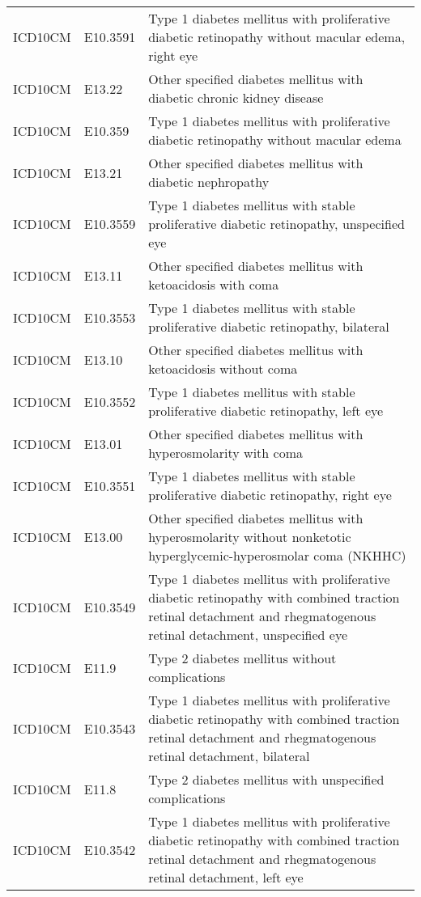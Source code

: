 \begin{table}[ht]
\begin{tabular}{lll}
  ICD10CM & E10.3591 & Type 1 diabetes mellitus with proliferative diabetic retinopathy without macular edema, right eye \\ 
  ICD10CM & E13.22 & Other specified diabetes mellitus with diabetic chronic kidney disease \\ 
  ICD10CM & E10.359 & Type 1 diabetes mellitus with proliferative diabetic retinopathy without macular edema \\ 
  ICD10CM & E13.21 & Other specified diabetes mellitus with diabetic nephropathy \\ 
  ICD10CM & E10.3559 & Type 1 diabetes mellitus with stable proliferative diabetic retinopathy, unspecified eye \\ 
  ICD10CM & E13.11 & Other specified diabetes mellitus with ketoacidosis with coma \\ 
  ICD10CM & E10.3553 & Type 1 diabetes mellitus with stable proliferative diabetic retinopathy, bilateral \\ 
  ICD10CM & E13.10 & Other specified diabetes mellitus with ketoacidosis without coma \\ 
  ICD10CM & E10.3552 & Type 1 diabetes mellitus with stable proliferative diabetic retinopathy, left eye \\ 
  ICD10CM & E13.01 & Other specified diabetes mellitus with hyperosmolarity with coma \\ 
  ICD10CM & E10.3551 & Type 1 diabetes mellitus with stable proliferative diabetic retinopathy, right eye \\ 
  ICD10CM & E13.00 & Other specified diabetes mellitus with hyperosmolarity without nonketotic hyperglycemic-hyperosmolar coma (NKHHC) \\ 
  ICD10CM & E10.3549 & Type 1 diabetes mellitus with proliferative diabetic retinopathy with combined traction retinal detachment and rhegmatogenous retinal detachment, unspecified eye \\ 
  ICD10CM & E11.9 & Type 2 diabetes mellitus without complications \\ 
  ICD10CM & E10.3543 & Type 1 diabetes mellitus with proliferative diabetic retinopathy with combined traction retinal detachment and rhegmatogenous retinal detachment, bilateral \\ 
  ICD10CM & E11.8 & Type 2 diabetes mellitus with unspecified complications \\ 
  ICD10CM & E10.3542 & Type 1 diabetes mellitus with proliferative diabetic retinopathy with combined traction retinal detachment and rhegmatogenous retinal detachment, left eye \\ 

\end{tabular}
\end{table}
